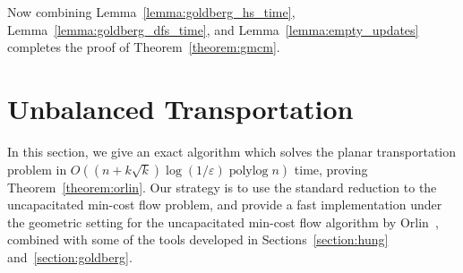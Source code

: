 \documentclass[a4paper,UKenglish]{socg-lipics-v2018}
\def\polylog{\mathop{\mathrm{polylog}}}
\def\eps{\varepsilon}
\def\norm#1{\mathopen\| #1 \mathclose\|}	%
\def\tsupply{\lambda}
\def\fsupply{\phi}
\def\arcto{\mathord\shortrightarrow}
\def\arc#1#2{#1\arcto#2}
\def\cost{\operatorname{cost}}
\theoremstyle{plain}
\numberwithin{figure}{section}
\begin{document}
\begin{toappendix}
%
Now combining Lemma~\ref{lemma:goldberg_hs_time}, Lemma~\ref{lemma:goldberg_dfs_time}, and
Lemma~\ref{lemma:empty_updates}
completes the proof of Theorem~\ref{theorem:gmcm}.

\end{toappendix}


\section{Unbalanced Transportation}
\label{section:orlin}

In this section, we give an exact algorithm which solves the planar transportation
problem in $O((n + k\sqrt{k})\log(1/\eps)\polylog n)$ time, proving Theorem~\ref{theorem:orlin}.
Our strategy is to use the standard reduction to the uncapacitated
min-cost flow problem, and provide a fast implementation under the geometric setting for the uncapacitated min-cost flow algorithm by Orlin~\cite{O93}, combined with some of the tools developed in Sections~\ref{section:hung} and~\ref{section:goldberg}.

\end{document}
